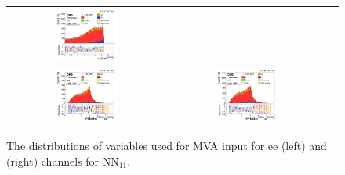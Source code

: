 \begin{figure}[ht]
\begin{center}
\begin{tabular}{ccc}
      \includegraphics[width=0.4\textwidth]{figures/tW/fig/MVA_input/mumu/H_1j1b_dPhi_ll_j1.png}\\
      \includegraphics[width=0.4\textwidth]{figures/tW/fig/MVA_input/ee/H_1j1b_dR_l1_j1.png}&
      \includegraphics[width=0.4\textwidth]{figures/tW/fig/MVA_input/mumu/H_1j1b_dR_l1_j1.png}\\
    \end{tabular}
    \caption{The distributions of variables used for MVA input for ee (left) and \mumu (right) channels for NN$_{11}$.
    \label{fig:MVA_1j1t_1}}
  \end{center}
\end{figure}

